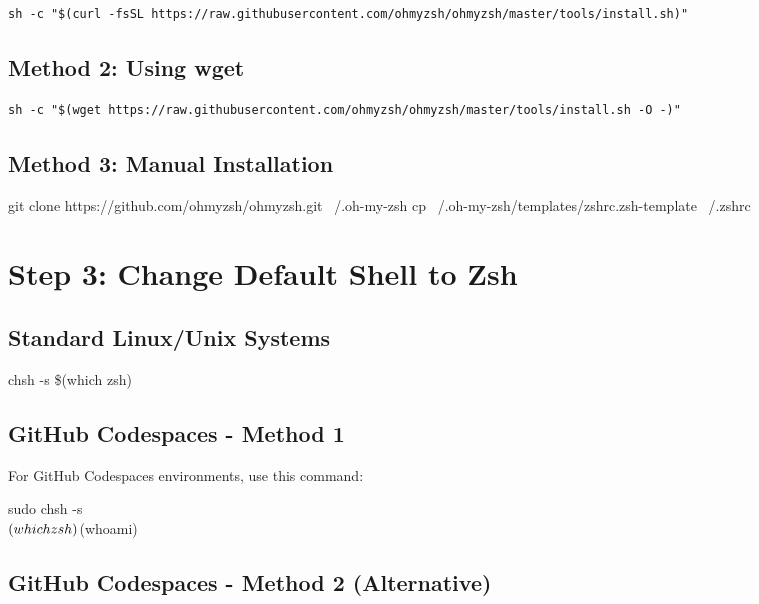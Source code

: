 \documentclass{article}
\begin{document}
\begin{verbatim}
sh -c "$(curl -fsSL https://raw.githubusercontent.com/ohmyzsh/ohmyzsh/master/tools/install.sh)"
\end{verbatim}

\subsection{Method 2: Using wget}

\begin{verbatim}
sh -c "$(wget https://raw.githubusercontent.com/ohmyzsh/ohmyzsh/master/tools/install.sh -O -)"
\end{verbatim}

\subsection{Method 3: Manual Installation}

\begin{codebox}
git clone https://github.com/ohmyzsh/ohmyzsh.git ~/.oh-my-zsh
cp ~/.oh-my-zsh/templates/zshrc.zsh-template ~/.zshrc
\end{codebox}

\section{Step 3: Change Default Shell to Zsh}

\subsection{Standard Linux/Unix Systems}

\begin{codebox}
chsh -s \$(which zsh)
\end{codebox}

\subsection{GitHub Codespaces - Method 1}

For GitHub Codespaces environments, use this command:

\begin{codebox}
sudo chsh -s \\$(which zsh) \\$(whoami)
\end{codebox}

\subsection{GitHub Codespaces - Method 2 (Alternative)}
\end{document}
